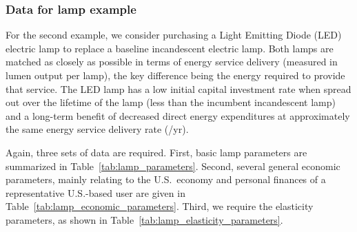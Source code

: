 \documentclass[12pt]{article}\usepackage[]{graphicx}\usepackage[]{xcolor}
\begin{document}
\subsubsection{Data for lamp example}
\label{sec:data_lamp_example}




For the second example,
we consider purchasing a Light Emitting Diode (LED) electric lamp
to replace a baseline incandescent electric lamp.
Both lamps are matched as closely as possible
in terms of energy service delivery (measured in lumen output per lamp),
the key difference being the energy required to provide that service.
The LED lamp has a low
initial capital investment rate
when spread out over the lifetime of the lamp
(less than the incumbent incandescent lamp)
and a long-term benefit of decreased direct energy expenditures
at approximately the same energy service delivery rate (\lmhr/yr).

Again, three sets of data are required.
First, basic lamp parameters are summarized in Table~\ref{tab:lamp_parameters}.
Second, several general economic parameters,
mainly relating to the U.S.\ economy and
personal finances
of a representative U.S.-based user are
given in Table~\ref{tab:lamp_economic_parameters}.
Third, we require the elasticity parameters,
as shown in Table~\ref{tab:lamp_elasticity_parameters}.
\end{document}
